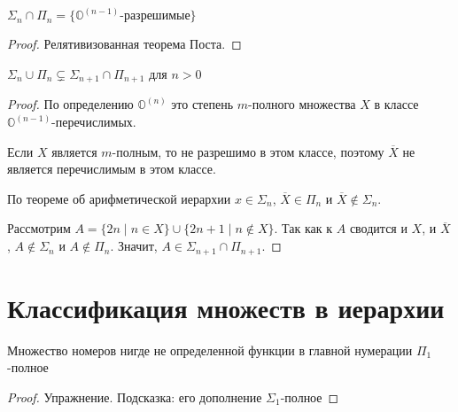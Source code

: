 \begin{cor}
	$ \Sigma_n \cap \Pi_n = \{\mathbb{O}^{(n-1)} \text{-разрешимые}\}$
\end{cor}
\begin{proof}
    Релятивизованная теорема Поста.
\end{proof}
\begin{cor}
    $ \Sigma_n \cup \Pi_n \subsetneq \Sigma_{n+1} \cap \Pi_{n+1}$ для $ n > 0$
\end{cor}
\begin{proof}
	По определению $ \mathbb{O}^{(n)}$ это степень $ m$-полного множества  $ X$ в классе  $ \mathbb{O}^{(n-1)}$-перечислимых.

	Если $ X$ является $ m$-полным, то не разрешимо в этом классе, поэтому $ \overline{X}$ не является перечислимым в этом классе.

	По теореме об арифметической иерархии $ x \in \Sigma_n$, $ \overline{X} \in \Pi_n$ и $ \overline{X} \notin \Sigma_n$.

	Рассмотрим $ A = \{2n \mid n \in X\} \cup \{2n+1 \mid n \notin X\}$. Так как к $ A$ сводится и $ X$, и  $ \overline{X}$, $ A \notin \Sigma_n$ и $ A \notin \Pi_n$. Значит, $ A \in \Sigma_{n+1} \cap \Pi_{n+1}$. 
\end{proof}


\section{Классификация множеств в иерархии}
\begin{thm}
    Множество номеров нигде не определенной функции в главной нумерации $ \Pi_1$-полное
\end{thm}
\begin{proof}
    Упражнение. Подсказка: его дополнение $ \Sigma_1$-полное
\end{proof}

